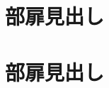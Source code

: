 \documentclass[dvipdfmx,media=ebook,paper=b5]{review-jsbook}
\def\reviewprefacefiles{
}
\def\reviewchapterfiles{\part{部扉見出し}




}
\def\reviewappendixfiles{
}
\def\reviewpostdeffiles{
}
\begin{document}
\ifdefined\reviewbegindocumenthook
\reviewbegindocumenthook
\fi

\ifdefined\reviewcoverpagecont
\covermatter
\reviewcoverpagecont
\fi

\ifdefined\reviewfrontmatterhook
\reviewfrontmatterhook
\fi

\ifdefined\reviewtitlepagecont
\reviewtitlepagecont
\fi

\ifdefined\revieworiginaltitlepagecont
\revieworiginaltitlepagecont
\fi

\ifdefined\reviewcreditfilecont
\reviewcreditfilecont
\fi

\ifdefined\reviewprefacefiles
\reviewprefacefiles
\fi

\ifdefined\reviewtableofcontents
\reviewtableofcontents
\fi

\ifdefined\reviewmainmatterhook
\reviewmainmatterhook
\fi

\ifdefined\reviewchapterfiles
\reviewchapterfiles
\fi

\ifdefined\reviewappendixhook
\reviewappendixhook
\fi

\ifdefined\reviewappendixfiles
\reviewappendixfiles
\fi

\ifdefined\reviewbackmatterhook
\reviewbackmatterhook
\fi

\ifdefined\reviewpostdeffiles
\reviewpostdeffiles
\fi

\ifdefined\reviewprintindex
\reviewprintindex
\fi

\ifdefined\reviewprofilepagecont
\reviewprofilepagecont
\fi

\ifdefined\reviewadvfilepagecont
\reviewadvfilepagecont
\fi

\ifdefined\reviewcolophonpagecont
\reviewcolophonpagecont
\fi

\ifdefined\reviewbackcovercont
\reviewbackcovercont
\fi

\ifdefined\reviewenddocumenthook
\reviewenddocumenthook
\fi
\end{document}
